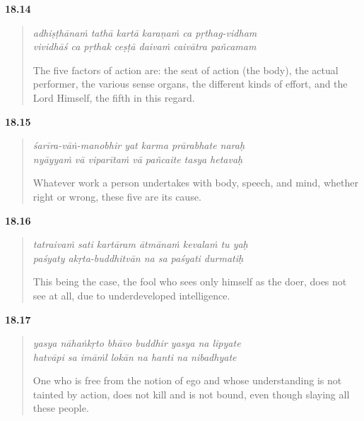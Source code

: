 \par\noindent\textbf{18.14}\par
\begin{verse}
\textit{adhiṣṭhānaṁ tathā kartā karaṇaṁ ca pṛthag-vidham} \\
\textit{vividhāś ca pṛthak ceṣṭā daivaṁ caivātra pañcamam}

\noindent The five factors of action are: the seat of action (the body), the actual performer, the various sense organs, the different kinds of effort, and the Lord Himself, the fifth in this regard.
\end{verse}
\par



\par\noindent\textbf{18.15}\par
\begin{verse}
\textit{śarīra-vāṅ-manobhir yat karma prārabhate naraḥ} \\
\textit{nyāyyaṁ vā viparītaṁ vā pañcaite tasya hetavaḥ}

\noindent Whatever work a person undertakes with body, speech, and mind, whether right or wrong, these five are its cause.
\end{verse}
\par



\par\noindent\textbf{18.16}\par
\begin{verse}
\textit{tatraivaṁ sati kartāram ātmānaṁ kevalaṁ tu yaḥ} \\
\textit{paśyaty akṛta-buddhitvān na sa paśyati durmatiḥ}

\noindent This being the case, the fool who sees only himself as the doer, does not see at all, due to underdeveloped intelligence.
\end{verse}
\par



\par\noindent\textbf{18.17}\par
\begin{verse}
\textit{yasya nāhaṅkṛto bhāvo buddhir yasya na lipyate} \\
\textit{hatvāpi sa imāṁl lokān na hanti na nibadhyate}

\noindent One who is free from the notion of ego and whose understanding is not tainted by action, does not kill and is not bound, even though slaying all these people.
\end{verse}
\par



